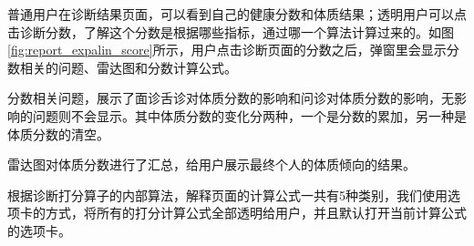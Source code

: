 普通用户在诊断结果页面，可以看到自己的健康分数和体质结果；透明用户可以点击诊断分数，了解这个分数是根据哪些指标，通过哪一个算法计算过来的。如图\ref{fig:report_expalin_score}所示，用户点击诊断页面的分数之后，弹窗里会显示分数相关的问题、雷达图和分数计算公式。

分数相关问题，展示了面诊舌诊对体质分数的影响和问诊对体质分数的影响，无影响的问题则不会显示。其中体质分数的变化分两种，一个是分数的累加，另一种是体质分数的清空。

雷达图对体质分数进行了汇总，给用户展示最终个人的体质倾向的结果。

根据诊断打分算子的内部算法，解释页面的计算公式一共有5种类别，我们使用选项卡的方式，将所有的打分计算公式全部透明给用户，并且默认打开当前计算公式的选项卡。

\begin{figure}[ht]
    \centering
    \subfigure[计算公式]{
}
\end{figure}
